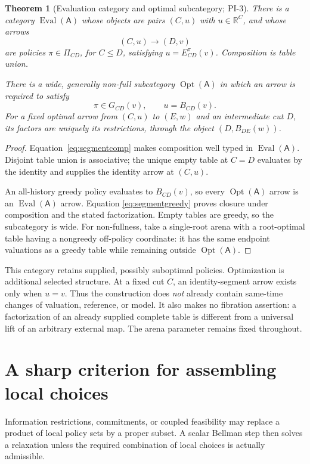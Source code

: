 \documentclass[11pt]{article}
\newtheorem{theorem}{Theorem}[section]
\theoremstyle{definition}
\newcommand{\R}{\mathbb R}
\newcommand{\A}{\mathsf A}
\newcommand{\Eval}{\operatorname{Eval}}
\newcommand{\Opt}{\operatorname{Opt}}
\begin{document}
\begin{theorem}[Evaluation category and optimal subcategory; PI-3]
\label{thm:categories}
There is a category \(\Eval(\A)\) whose objects are pairs \((C,u)\) with
\(u\in\R^C\), and whose arrows
\[
 (C,u)\longrightarrow(D,v)
\]
are policies \(\pi\in\Pi_{CD}\), for \(C\leq D\), satisfying
\(u=E_{CD}^{\pi}(v)\). Composition is table union.

There is a wide, generally non-full subcategory \(\Opt(\A)\) in which an
arrow is required to satisfy
\[
 \pi\in G_{CD}(v),\qquad u=B_{CD}(v).
\]
For a fixed optimal arrow from \((C,u)\) to \((E,w)\) and an intermediate cut
\(D\), its factors are uniquely its restrictions, through the object
\((D,B_{DE}(w))\).
\end{theorem}
\begin{proof}
Equation~\eqref{eq:segmentcomp} makes composition well typed in
\(\Eval(\A)\). Disjoint table union is associative; the unique empty
table at \(C=D\) evaluates by the identity and supplies the identity
arrow at \((C,u)\).

An all-history greedy policy evaluates to \(B_{CD}(v)\), so every
\(\Opt(\A)\) arrow is an \(\Eval(\A)\) arrow. Equation
\eqref{eq:segmentgreedy} proves closure under composition and the stated
factorization. Empty tables are greedy, so the subcategory is wide.
For non-fullness, take a single-root arena with a root-optimal table
having a nongreedy off-policy coordinate: it has the same endpoint
valuations as a greedy table while remaining outside \(\Opt(\A)\).
\end{proof}

This category retains supplied, possibly suboptimal policies. Optimization
is additional selected structure. At a fixed cut \(C\), an identity-segment
arrow exists only when \(u=v\). Thus the construction does \emph{not} already
contain same-time changes of valuation, reference, or model. It also makes
no fibration assertion: a factorization of an already supplied complete
table is different from a universal lift of an arbitrary external map.
The arena parameter remains fixed throughout.

\section{A sharp criterion for assembling local choices}
\label{sec:rectangle}
Information restrictions, commitments, or coupled feasibility may replace a
product of local policy sets by a proper subset. A scalar Bellman step then
solves a relaxation unless the required combination of local choices is
actually admissible.
\end{document}
